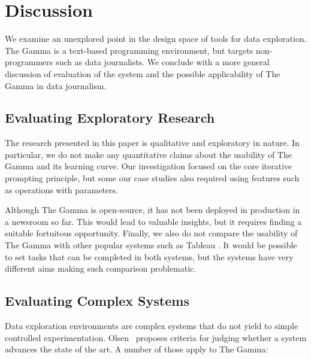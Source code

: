 \documentclass[manuscript,review,anonymous]{acmart}
\begin{document}

\section{Discussion}
We examine an unexplored point in the design space of tools for data exploration. The Gamma is a
text-based programming environment, but targets non-programmers such as data journalists. We
conclude with a more general discussion of evaluation of the system and the possible applicability
of The Gamma in data journalism.

\subsection{Evaluating Exploratory Research}
The research presented in this paper is qualitative and exploratory in nature. In particular,
we do not make any quantitative claims about the usability of The Gamma and its learning curve.
Our investigation focused on the core iterative prompting principle, but some our case studies
also required using features such as operations with parameters.

Although The Gamma is open-source, it has not been deployed in production in a newsroom so far.
This would lead to valuable insights, but it requires finding a suitable fortuitous opportunity.
Finally, we also do not compare the usability of The Gamma with other popular systems
such as Tableau \cite{tableau}. It would be possible to set tasks that can be completed
in both systems, but the systems have very different aims making such comparison problematic.

\subsection{Evaluating Complex Systems}
Data exploration environments are complex systems that do not yield to simple controlled
experimentation. Olsen~\cite{evaluating} proposes criteria for judging whether a system advances
the state of the art. A number of those apply to The Gamma:
\end{document}
